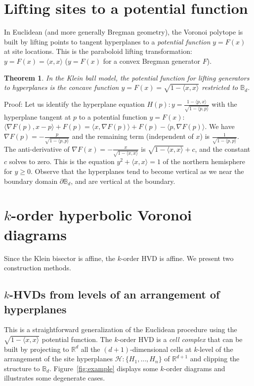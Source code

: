 \documentclass[12pt]{article}
\newtheorem{theorem}{Theorem}
\def\bbB{\mathbb{B}}
\def\inner#1#2{{\langle #1,#2\rangle}}
\def\bbB{\mathbb{B}}
\begin{document}
\section{Lifting sites to a potential function}


In Euclidean (and more generally Bregman geometry), the Voronoi polytope is built by lifting points to tangent hyperplanes to a {\em potential function} $y=F(x)$ at site locations. This is the paraboloid lifting transformation:  $y=F(x)=\inner{x}{x}$ ($y=F(x)$ for a convex Bregman generator $F$).

\begin{theorem}
In the Klein ball model, the {\em potential function} for lifting generators to hyperplanes is the {\em concave} function 
$y=F(x)=\sqrt{1-\inner{x}{x}}$ restricted to $\bbB_d$.
\end{theorem}

Proof:
Let us identify the  hyperplane equation $H(p): y=\frac{1-\inner{p}{x}}{\sqrt{1-\inner{p}{p}}}$ with
the hyperplane tangent at $p$ to a potential function $y=F(x)$: 
$\inner{\nabla F(p)}{x-p}+F(p)=\inner{x}{\nabla F(p)} + F(p)-\inner{p}{\nabla F(p)}$.
We have $\nabla F(p)=-\frac{p}{\sqrt{1-\inner{p}{p}}}$ and the remaining term (independent of $x$) is $\frac{1}{\sqrt{1-\inner{p}{p}}}$.
The anti-derivative of $\nabla F(x)=-\frac{x}{\sqrt{1-\inner{x}{x}}}$ is $\sqrt{1-\inner{x}{x}}+c$, and the constant $c$ solves to zero.
This is the equation $y^2+\inner{x}{x}=1$ of the northern hemisphere for $y\geq 0$.
Observe that the hyperplanes tend to become vertical as we near the boundary domain $\partial\bbB_d$, and are vertical at the boundary.
 
\section{$k$-order hyperbolic Voronoi diagrams}

Since the Klein bisector is affine, the $k$-order HVD is affine. We present two construction methods.


\subsection{$k$-HVDs from levels of an  arrangement of hyperplanes}
This is a straightforward generalization of the Euclidean procedure using the $\sqrt{1-\inner{x}{x}}$ potential function.
The $k$-order HVD is a {\em cell complex} that can be built by projecting to $\mathbb{R}^d$ all the $(d+1)$-dimensional cells at $k$-level of the arrangement of the site hyperplanes $\mathcal{H}:\{H_1, ..., H_n\}$ of $\mathbb{R}^{d+1}$  and clipping the structure to $\bbB_d$.
Figure~\ref{fig:example} displays some $k$-order diagrams and illustrates some degenerate cases.
\end{document}
